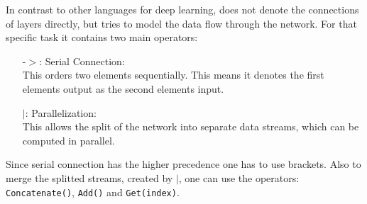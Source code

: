 In contrast to other languages for deep learning, \cnnarch does not denote the connections of layers directly, but tries to model the data flow through the network. For that specific task it contains two main operators:
\begin{itemize}
	\item[-$>$:] Serial Connection:\label{item: sequential connection}\\
	This orders two elements sequentially. This means it denotes the first elements output as the second elements input. 
	\item[$|$:] Parallelization:\\
	This allows the split of the network into separate data streams, which can be computed in parallel.
\end{itemize}
Since serial connection has the higher precedence one has to use brackets. Also to merge the splitted streams, created by $|$, one can use the operators: \texttt{Concatenate()}, \texttt{Add()} and \texttt{Get(index)}.


